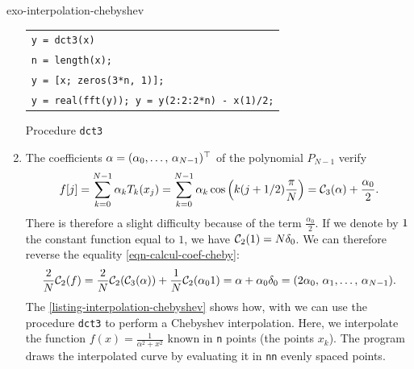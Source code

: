 \begin{correction}{exo-interpolation-chebyshev}
\begin{enumerate}
\begin{listing} \begin{footnotesize}
{\upshape
\begin{tabular}{l} \texttt{\pfunction y = dct3(x)} \\
\texttt{n = length(x);} \\
\texttt{y = [x; zeros(3*n, 1)];} \\
\texttt{y = real(fft(y)); y = y(2:2:2*n) - x(1)/2;} \\
\end{tabular}
}
\end{footnotesize}
\caption{Procedure \texttt{\upshape dct3}}
\label{listing-dct3}
\end{listing}
 
\item The coefficients $ \alpha = (\alpha_0, \ldots, \, \alpha_{N-1})^\top $ of the polynomial $ P_{N-1} $ verify
\begin{equation}
\label{eqn-calcul-coef-cheby}
f [j] = \sum_{k = 0}^{N-1}{\alpha_k T_k(x_j)} = \sum_{k = 0}^{N-1}{\alpha_k \cos \left(k( j+1/2) \frac{\pi}{N} \right)} = \mathcal{C}_3(\alpha) + \frac{\alpha_0}{2}.
\end{equation}
There is therefore a slight difficulty because of the term  $ \frac{\alpha_0}{2} $. If we denote by $ 1 $ the constant function equal to $ 1 $, we have $ \mathcal{C}_2(1) = N \delta_0 $. We can therefore reverse the equality \ref{eqn-calcul-coef-cheby}:
\begin{equation*}
\frac{2}{N} \mathcal{C}_2(f) = \frac{2}{N} \mathcal{C}_2(\mathcal{C}_3(\alpha)) + \frac{1}{N} \mathcal{C}_2(\alpha_0 1) = \alpha + \alpha_0 \delta_0 = (2 \alpha_0, \, \alpha_1, \ldots, \, \alpha_{N-1}).
\end{equation*}
The \listingterme{} \ref{listing-interpolation-chebyshev} shows how, with \Matlab{} we can use the procedure \texttt{\upshape dct3} to perform a Chebyshev interpolation. Here, we interpolate the function $ f(x) = \frac{1}{\alpha^2 + x^2} $ known in \texttt{\upshape n} points (the points $ x_k $). The program draws the interpolated curve by evaluating it in \texttt{\upshape nn} evenly spaced points.


\end{enumerate}
\end{correction}
